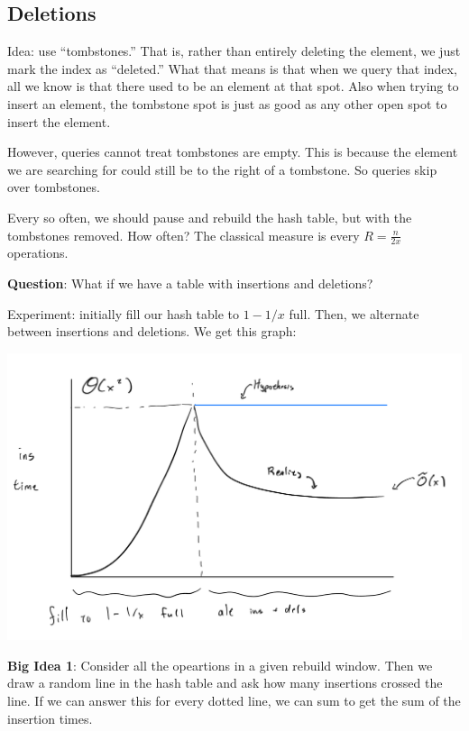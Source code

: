 \documentclass{report}
\begin{document}
\subsection{Deletions}
Idea: use ``tombstones.'' That is, rather than entirely deleting the element, we just mark the index as ``deleted.'' What that means is that when we query that index, all we know is that there used to be an element at that spot. Also when trying to insert an element, the tombstone spot is just as good as any other open spot to insert the element. 

However, queries cannot treat tombstones are empty. This is because the element we are searching for could still be to the right of a tombstone. So queries skip over tombstones. 

Every so often, we should pause and rebuild the hash table, but with the tombstones removed. How often? The classical measure is every $R =  \frac{n}{2x}$ operations. 

\noindent \textbf{Question}: What if we have a table with insertions and deletions?

\noindent Experiment: initially fill our hash table to $1 - 1/x$ full. Then, we alternate between insertions and deletions. We get this graph:

\begin{center}
    \includegraphics*[width=15cm]{hashtableexperiment.jpg}
\end{center}
\newpage
{}
\noindent \textbf{Big Idea 1}: Consider all the opeartions in a given rebuild window. Then we draw a random line in the hash table and ask how many insertions crossed the line. If we can answer this for every dotted line, we can sum to get the sum of the insertion times. 
\end{document}
